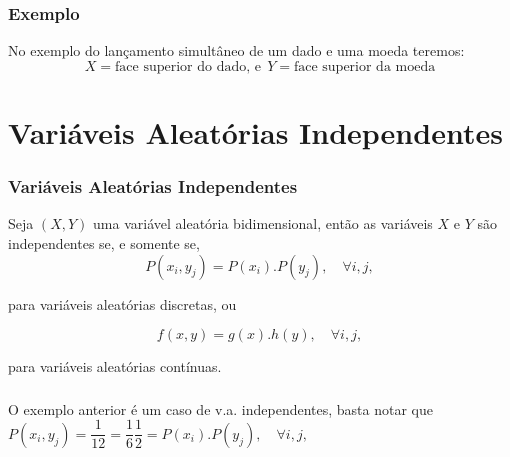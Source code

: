 \documentclass[14pt,aspectratio=1610]{beamer}
\begin{document}
\begin{frame}{}
\frametitle{Exemplo}
\begin{block}{}
No exemplo do lançamento simultâneo de um dado e uma moeda teremos:
$$X= \textrm{face superior do dado,\ e}\ \ Y=\textrm{face superior da moeda}$$
\begin{table}[h]
\centering
{}
\end{table}
\end{block}
\end{frame}

\section{Variáveis Aleatórias Independentes}
\begin{frame}{}
\frametitle{Variáveis Aleatórias Independentes}
\begin{block}{}
\justifying
Seja $(X, Y)$ uma variável aleatória bidimensional, então as variáveis $X$ e $Y$
são independentes se, e somente se, 
$$P(x_{i}, y_{j}) = P(x_{i}).P (y_{j}),\quad \forall i,j,$$

para variáveis aleatórias discretas, ou 

$$f(x, y) = g(x).h(y),\quad \forall i,j,$$

para variáveis aleatórias contínuas. 

\end{block}
\end{frame}

\begin{frame}{}
\frametitle{}
\begin{block}{}
\justifying
O exemplo anterior é um caso de v.a. independentes, basta notar que 
$P(x_{i}, y_{j}) =\dfrac{1}{12}= \dfrac{1}{6}\dfrac{1}{2}=P(x_{i}).P (y_{j}),\quad \forall i,j,$
\end{block}
\end{frame}
\end{document}
